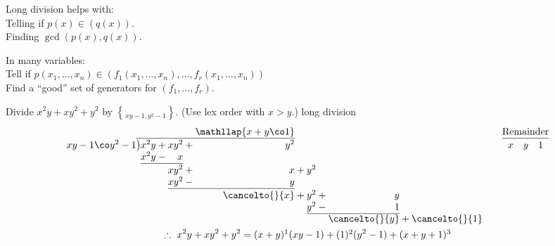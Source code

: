 Long division helps with: \\
Telling if $p(x)\in(q(x))$. \\
Finding $\gcd(p(x),q(x))$.

In many variables: \\
Tell if $p(x_1,\dotsc,x_n)\in(f_1(x_1,\dotsc,x_n),\dotsc,f_r(x_1,\dotsc,x_n))$ \\
Find a ``good'' set of generators for $(f_1,\dotsc,f_r)$.

\eg Divide $x^2y+xy^2+y^2$ by $\brace{xy-1,y^2-1}$. (Use lex order with $x>y$.)
long division
\begin{gather*}
\begin{array}{@{}r@{}r@{}r@{}r@{}r@{}r@{}r@{}r@{}r@{}r@{}r@{}r@{}r@{\qquad}c@{}}
& & & & & & \mathllap{x+y\co1} & & & & & & & \text{Remainder} \\
\cline{2-7} \cline{14-14}
xy-1\co y^2-1\rule{0pt}{1em}& \bigl) & x^2y & {}+{} & xy^2 & {}+{} & y^2 & & & & & & & x\quad y\quad 1 \\
& & x^2y & {}-{} & x & \\
\cline{3-5}
\rule{0pt}{1em}& & & & xy^2 & {}+{} & x & {}+{} & y^2 \\
& & & & xy^2 &{}-{}& y \\
\cline{5-7}
\rule{0pt}{1em}& & & & & & \cancelto{}{x} &{}+{}& y^2 &{}+{}& y \\
& & & & & & & & y^2 &{}-{}& 1 \\ \cline{9-11}
& & & & & & & & & & \cancelto{}{y} &{}+{} & \cancelto{}{1}
\end{array} \\
\therefore~x^2y+xy^2+y^2 = (x+y)\footnote{coefficient of $xy-1$}(xy-1) + (1)\footnote{coefficient of $y^2-1$}(y^2-1) + (x+y+1)\footnote{remainder}
\end{gather*}
%
